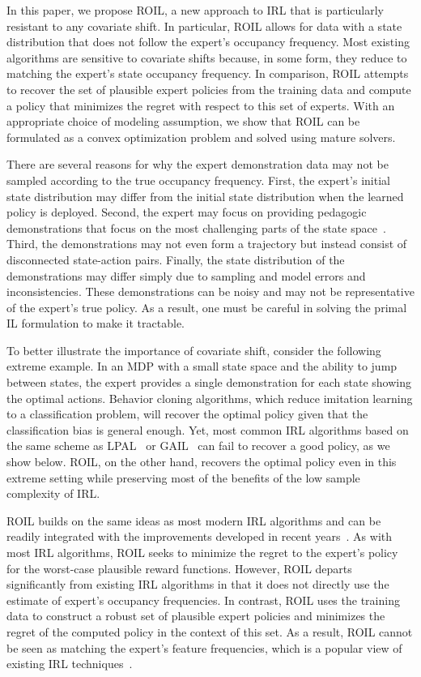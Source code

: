 \documentclass[10pt]{article}
\renewcommand{\cite}{\citep}
\theoremstyle{plain}
\theoremstyle{remark}
\begin{document}
In this paper, we propose ROIL, a new approach to IRL that is particularly resistant to any covariate shift. In particular, ROIL allows for data with a state distribution that does not follow the expert's occupancy frequency. Most existing algorithms are sensitive to covariate shifts because, in some form, they reduce to matching the expert's state occupancy frequency. In comparison, ROIL attempts to recover the set of plausible expert policies from the training data and compute a policy that minimizes the regret with respect to this set of experts. With an appropriate choice of modeling assumption, we show that ROIL can be formulated as a convex optimization problem and solved using mature solvers.

There are several reasons for why the expert demonstration data may not be sampled according to the true occupancy frequency. First, the expert's initial state distribution may differ from the initial state distribution when the learned policy is deployed. Second, the expert may focus on providing pedagogic demonstrations that focus on the most challenging parts of the state space~\cite{cakmak2012algorithmic,hadfield2016cooperative,Brown2018b}. Third, the demonstrations may not even form a trajectory but instead consist of disconnected state-action pairs. Finally, the state distribution of the demonstrations may differ simply due to sampling and model errors and inconsistencies. These demonstrations can be noisy and may not be representative of the expert's true policy. As a result, one must be careful in solving the primal IL formulation to make it tractable.

To better illustrate the importance of covariate shift, consider the following extreme example. In an MDP with a small state space and the ability to jump between states, the expert provides a single demonstration for each state showing the optimal actions. Behavior cloning algorithms, which reduce imitation learning to a classification problem, will recover the optimal policy given that the classification bias is general enough. Yet, most common IRL algorithms based on the same scheme as LPAL~\cite{Syed2008} or GAIL~\cite{Ho2016} can fail to recover a good policy, as we show below. ROIL, on the other hand, recovers the optimal policy even in this extreme setting while preserving most of the benefits of the low sample complexity of IRL.

ROIL builds on the same ideas as most modern IRL algorithms and can be readily integrated with the improvements developed in recent years~\cite{arora2021survey}. As with most IRL algorithms, ROIL seeks to minimize the regret to the expert's policy for the worst-case plausible reward functions. However, ROIL departs significantly from existing IRL algorithms in that it does not directly use the estimate of expert's occupancy frequencies. In contrast, ROIL uses the training data to construct a robust set of plausible expert policies and minimizes the regret of the computed policy in the context of this set. As a result, ROIL cannot be seen as matching the expert's feature frequencies, which is a popular view of existing IRL techniques~\cite{abbeel2004,Syed2008,Ho2016}.
\end{document}
